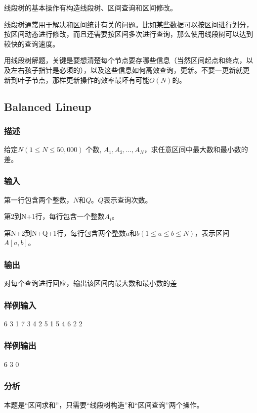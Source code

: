 线段树的基本操作有构造线段树、区间查询和区间修改。

线段树通常用于解决和区间统计有关的问题。比如某些数据可以按区间进行划分，按区间动态进行修改，而且还需要按区间多次进行查询，那么使用线段树可以达到较快的查询速度。

用线段树解题，关键是要想清楚每个节点要存哪些信息（当然区间起点和终点，以及左右孩子指针是必须的），以及这些信息如何高效查询，更新。不要一更新就更新到叶子节点，那样更新操作的效率最坏有可能$O(N)$的。

\subsection{Balanced Lineup} %
\subsubsection{描述}
给定$N(1 \leq N \leq 50,000)$ 个数, $A_1, A_2, ... , A_N$，求任意区间中最大数和最小数的差。

\subsubsection{输入}
第一行包含两个整数，$N$和$Q$。$Q$表示查询次数。

第2到N+1行，每行包含一个整数$A_i$。

第N+2到N+Q+1行，每行包含两个整数$a$和$b(1 \leq a \leq b \leq N)$，表示区间$A[a,b]$。

\subsubsection{输出}
对每个查询进行回应，输出该区间内最大数和最小数的差

\subsubsection{样例输入}
\begin{Code}
6 3
1
7
3
4
2
5
1 5
4 6
2 2
\end{Code}

\subsubsection{样例输出}
\begin{Code}
6
3
0
\end{Code}

\subsubsection{分析}
本题是“区间求和”，只需要“线段树构造”和“区间查询”两个操作。

